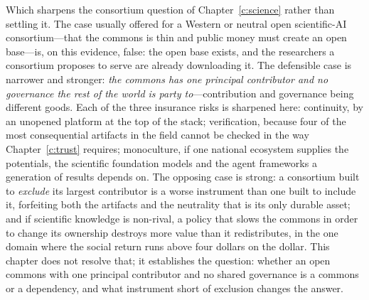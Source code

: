 Which sharpens the consortium question of Chapter~\ref{c:science} rather than settling it. The case usually offered for a Western or neutral open scientific-AI consortium---that the commons is thin and public money must create an open base---is, on this evidence, false: the open base exists, and the researchers a consortium proposes to serve are already downloading it. The defensible case is narrower and stronger: \emph{the commons has one principal contributor and no governance the rest of the world is party to}---contribution and governance being different goods. Each of the three insurance risks is sharpened here: continuity, by an unopened platform at the top of the stack; verification, because four of the most consequential artifacts in the field cannot be checked in the way Chapter~\ref{c:trust} requires; monoculture, if one national ecosystem supplies the potentials, the scientific foundation models and the agent frameworks a generation of results depends on. The opposing case is strong: a consortium built to \emph{exclude} its largest contributor is a worse instrument than one built to include it, forfeiting both the artifacts and the neutrality that is its only durable asset; and if scientific knowledge is non-rival, a policy that slows the commons in order to change its ownership destroys more value than it redistributes, in the one domain where the social return runs above four dollars on the dollar. This chapter does not resolve that; it establishes the question: whether an open commons with one principal contributor and no shared governance is a commons or a dependency, and what instrument short of exclusion changes the answer.
